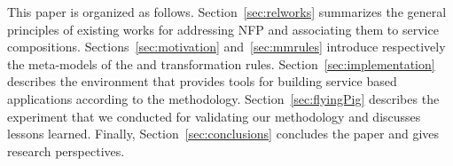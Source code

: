 This paper is organized as follows.
Section~\ref{sec:relworks} summarizes the general principles of existing works for addressing NFP and associating them to service compositions.
Sections~\ref{sec:motivation}  and~\ref{sec:mmrules} introduce respectively the meta-models of the \pisodm and transformation rules. 
Section~\ref{sec:implementation} describes the \pisodm environment that provides tools for building service based applications according to the \pisodm methodology. 
Section~\ref{sec:flyingPig} describes the experiment that we conducted for validating our methodology and discusses lessons learned. 
Finally, Section~\ref{sec:conclusions} concludes the paper and gives research perspectives.





